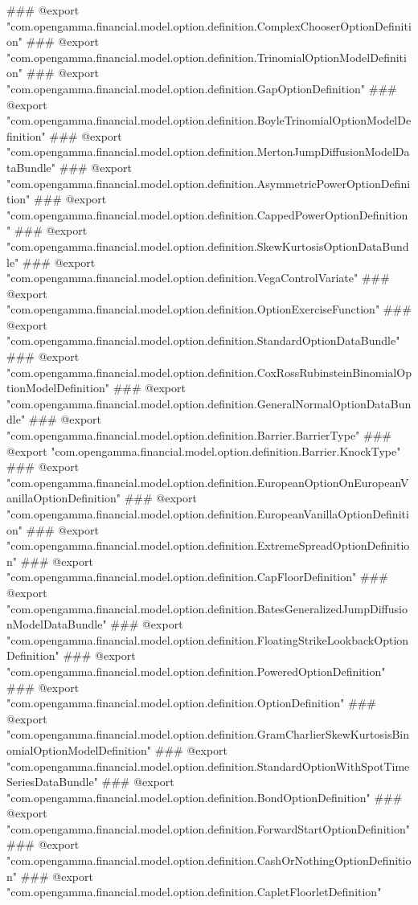 ### @export "com.opengamma.financial.model.option.definition.ComplexChooserOptionDefinition"
### @export "com.opengamma.financial.model.option.definition.TrinomialOptionModelDefinition"
### @export "com.opengamma.financial.model.option.definition.GapOptionDefinition"
### @export "com.opengamma.financial.model.option.definition.BoyleTrinomialOptionModelDefinition"
### @export "com.opengamma.financial.model.option.definition.MertonJumpDiffusionModelDataBundle"
### @export "com.opengamma.financial.model.option.definition.AsymmetricPowerOptionDefinition"
### @export "com.opengamma.financial.model.option.definition.CappedPowerOptionDefinition"
### @export "com.opengamma.financial.model.option.definition.SkewKurtosisOptionDataBundle"
### @export "com.opengamma.financial.model.option.definition.VegaControlVariate"
### @export "com.opengamma.financial.model.option.definition.OptionExerciseFunction"
### @export "com.opengamma.financial.model.option.definition.StandardOptionDataBundle"
### @export "com.opengamma.financial.model.option.definition.CoxRossRubinsteinBinomialOptionModelDefinition"
### @export "com.opengamma.financial.model.option.definition.GeneralNormalOptionDataBundle"
### @export "com.opengamma.financial.model.option.definition.Barrier.BarrierType"
### @export "com.opengamma.financial.model.option.definition.Barrier.KnockType"
### @export "com.opengamma.financial.model.option.definition.EuropeanOptionOnEuropeanVanillaOptionDefinition"
### @export "com.opengamma.financial.model.option.definition.EuropeanVanillaOptionDefinition"
### @export "com.opengamma.financial.model.option.definition.ExtremeSpreadOptionDefinition"
### @export "com.opengamma.financial.model.option.definition.CapFloorDefinition"
### @export "com.opengamma.financial.model.option.definition.BatesGeneralizedJumpDiffusionModelDataBundle"
### @export "com.opengamma.financial.model.option.definition.FloatingStrikeLookbackOptionDefinition"
### @export "com.opengamma.financial.model.option.definition.PoweredOptionDefinition"
### @export "com.opengamma.financial.model.option.definition.OptionDefinition"
### @export "com.opengamma.financial.model.option.definition.GramCharlierSkewKurtosisBinomialOptionModelDefinition"
### @export "com.opengamma.financial.model.option.definition.StandardOptionWithSpotTimeSeriesDataBundle"
### @export "com.opengamma.financial.model.option.definition.BondOptionDefinition"
### @export "com.opengamma.financial.model.option.definition.ForwardStartOptionDefinition"
### @export "com.opengamma.financial.model.option.definition.CashOrNothingOptionDefinition"
### @export "com.opengamma.financial.model.option.definition.CapletFloorletDefinition"
